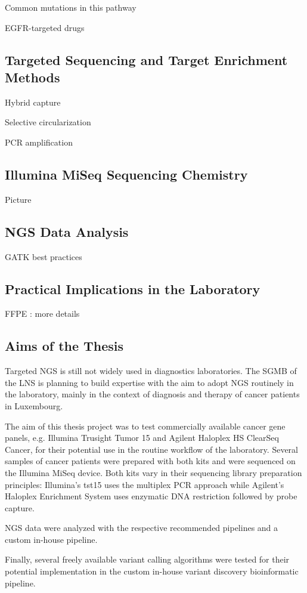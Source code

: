 Common mutations in this pathway

EGFR-targeted drugs

\subsection{Targeted Sequencing and Target Enrichment Methods}

{\cite{enrichment_methods:2011}}

Hybrid capture

Selective circularization

PCR amplification

\subsection{Illumina MiSeq Sequencing Chemistry}

Picture

\subsection{NGS Data Analysis}

GATK best practices

\subsection{Practical Implications in the Laboratory}

FFPE : more details

\subsection{Aims of the Thesis}
Targeted NGS is still not widely used in diagnostics laboratories. The SGMB of the LNS
is planning to build expertise with the aim to adopt NGS routinely in the laboratory,
mainly in the context of diagnosis and therapy of cancer patients in Luxembourg.

The aim of this thesis project was to test commercially available cancer gene panels,
e.g. Illumina Trusight Tumor 15 and Agilent Haloplex HS ClearSeq Cancer, for their
potential use in the routine workflow of the laboratory. Several samples of cancer
patients were prepared with both kits and were sequenced on the Illumina MiSeq device.
Both kits vary in their sequencing library preparation principles: Illumina's tst15
uses the multiplex PCR approach while Agilent's Haloplex Enrichment System uses
enzymatic DNA restriction followed by probe capture.

NGS data were analyzed with the respective recommended pipelines and a custom in-house
pipeline.

Finally, several freely available variant calling algorithms were tested for their
potential implementation in the custom in-house variant discovery bioinformatic
pipeline.
